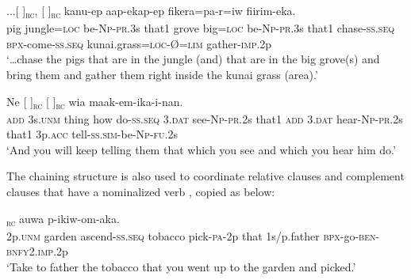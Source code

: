 \ea%
\label{ex:8:x1381}
\gll ...[      ]\textsubscript{\textsc{rc}}, [  
  ]\textsubscript{\textsc{rc}}  kanu-ep  aap-ekap-ep fikera=pa-r=iw  fiirim-eka.\\
pig  jungle=\textsc{loc} be-\textsc{Np}-\textsc{pr}.3s that1 grove  big=\textsc{loc} be-\textsc{Np}-\textsc{pr}.3s that1 chase-\textsc{ss}.\textsc{seq} \textsc{\textsc{bp}x}-come-\textsc{ss}.\textsc{seq} kunai.grass=\textsc{loc}-{\O}=\textsc{lim} gather-\textsc{imp}.2p\\
\glt`{\dots}chase the pigs that are in the jungle (and) that are in the big grove(s) and bring them and gather them right inside the kunai grass (area).'
\z


\ea%
\label{ex:8:x1382}
\gll Ne [       ]\textsubscript{\textsc{rc}}   [  ]\textsubscript{\textsc{rc}} wia  maak-em-ika-i-nan.\\
\textsc{add} 3s.\textsc{unm} thing  how  do-\textsc{ss}.\textsc{seq} 3.\textsc{dat} see-\textsc{Np}-\textsc{pr}.2s that1 \textsc{add} 3.\textsc{dat} hear-\textsc{Np}-\textsc{pr}.2s that1 3p.\textsc{acc} tell-\textsc{ss}.\textsc{sim}-be-\textsc{Np}-\textsc{fu}.2s\\
\glt`And you will keep telling them that which you see and which you hear him do.'
\z


The chaining structure is also used to coordinate relative clauses  and complement clauses that have a nominalized verb , copied as  below: 

\ea%
\label{ex:8:x1463}
\textsubscript{\textsc{rc}}  auwa  p-ikiw-om-aka.\\
2p.\textsc{unm} garden ascend-\textsc{ss}.\textsc{seq} tobacco  pick-\textsc{pa}-2p that 1s/p.father \textsc{\textsc{bp}x}-go-\textsc{ben}-\textsc{bnfy}2.\textsc{imp}.2p\\
\glt`Take to father the tobacco that you went up to the garden and picked.'
\z


